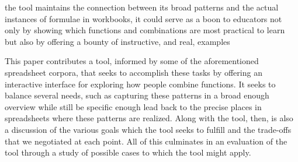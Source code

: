 \documentclass[conference]{IEEEtran}
\begin{document}
	the tool maintains the connection between its broad patterns and the actual
	instances of formulae in workbooks, it could serve as a boon to educators not
	only by showing which functions and combinations are most practical to learn
	but also by offering a bounty of instructive, and real, examples \par This
	paper contributes a tool, informed by some of the aforementioned spreadsheet
	corpora, that seeks to accomplish these tasks by offering an interactive
	interface for exploring how people combine functions. It seeks to balance
	several needs, such as capturing these patterns in a broad enough overview
	while still be specific enough lead back to the precise places in spreadsheets
	where these patterns are realized. Along with the tool, then, is also a
	discussion of the various goals which the tool seeks to fulfill and the
	trade-offs that we negotiated at each point. All of this culminates in an
	evaluation of the tool through a study of possible cases to which the tool
	might apply.
	
\end{document}
